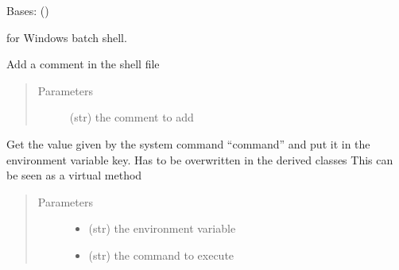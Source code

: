 \documentclass[a4paper,10pt,english]{sphinxmanual}
\begin{document}
\begin{fulllineitems}
\label{\detokenize{apidoc_src/src:src.fileEnviron.BatFileEnviron}}
Bases: {\hyperref[\detokenize{apidoc_src/src:src.fileEnviron.FileEnviron}]{}} ()

for Windows batch shell.

\begin{fulllineitems}
\label{\detokenize{apidoc_src/src:src.fileEnviron.BatFileEnviron.add_comment}}
Add a comment in the shell file
\begin{quote}\begin{description}
\item[{Parameters}] \leavevmode
{} \textendash{} (str) the comment to add

\end{description}\end{quote}

\end{fulllineitems}


\begin{fulllineitems}
\label{\detokenize{apidoc_src/src:src.fileEnviron.BatFileEnviron.command_value}}
Get the value given by the system command “command” 
and put it in the environment variable key.
Has to be overwritten in the derived classes
This can be seen as a virtual method
\begin{quote}\begin{description}
\item[{Parameters}] \leavevmode\begin{itemize}
\item {} 
 \textendash{} (str) the environment variable

\item {} 
 \textendash{} (str) the command to execute


\end{itemize}
\end{description}
\end{quote}
\end{fulllineitems}
\end{fulllineitems}
\end{document}
